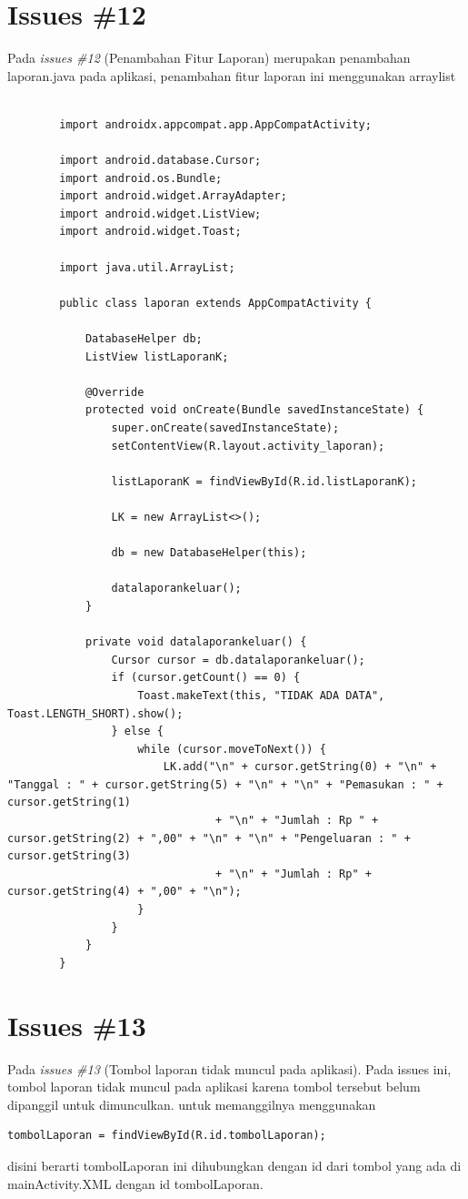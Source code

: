\section{Issues \#12}
Pada \textit{issues \#12} (Penambahan Fitur Laporan) merupakan penambahan laporan.java pada aplikasi, penambahan fitur laporan ini menggunakan arraylist
\begin{verbatim}

        import androidx.appcompat.app.AppCompatActivity;

        import android.database.Cursor;
        import android.os.Bundle;
        import android.widget.ArrayAdapter;
        import android.widget.ListView;
        import android.widget.Toast;
        
        import java.util.ArrayList;
        
        public class laporan extends AppCompatActivity {
        
            DatabaseHelper db;
            ListView listLaporanK;
        
            @Override
            protected void onCreate(Bundle savedInstanceState) {
                super.onCreate(savedInstanceState);
                setContentView(R.layout.activity_laporan);
        
                listLaporanK = findViewById(R.id.listLaporanK);
        
                LK = new ArrayList<>();
        
                db = new DatabaseHelper(this);
        
                datalaporankeluar();
            }
        
            private void datalaporankeluar() {
                Cursor cursor = db.datalaporankeluar();
                if (cursor.getCount() == 0) {
                    Toast.makeText(this, "TIDAK ADA DATA", Toast.LENGTH_SHORT).show();
                } else {
                    while (cursor.moveToNext()) {
                        LK.add("\n" + cursor.getString(0) + "\n" + "Tanggal : " + cursor.getString(5) + "\n" + "\n" + "Pemasukan : " + cursor.getString(1)
                                + "\n" + "Jumlah : Rp " + cursor.getString(2) + ",00" + "\n" + "\n" + "Pengeluaran : " + cursor.getString(3)
                                + "\n" + "Jumlah : Rp" + cursor.getString(4) + ",00" + "\n");
                    }
                }
            }
        }
\end{verbatim}

\section{Issues \#13}
Pada \textit{issues \#13} (Tombol laporan tidak muncul pada aplikasi). Pada issues ini, tombol laporan tidak muncul pada aplikasi karena tombol tersebut belum dipanggil untuk dimunculkan. untuk memanggilnya menggunakan \begin{verbatim}
tombolLaporan = findViewById(R.id.tombolLaporan);
\end{verbatim}
disini berarti tombolLaporan ini dihubungkan dengan id dari tombol yang ada di mainActivity.XML dengan id tombolLaporan.

